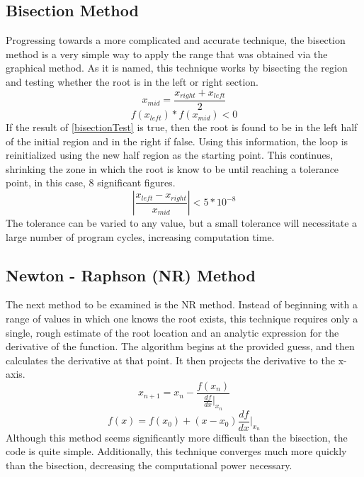 \documentclass[12pt]{article}
\begin{document}
\subsection{Bisection Method}
Progressing towards a more complicated and accurate technique, the bisection method is a very simple way to apply the range that was obtained via the graphical method.  As it is named, this technique works by bisecting the region and testing whether the root is in the left or right section.  
\begin{equation}
\label{midpoint}
x_{mid} = \frac{x_{right}+x_{left}}{2}
\end{equation}
\begin{equation}
\label{bisectionTest}
f(x_{left})*f(x_{mid}) < 0
\end{equation}
If the result of  \eqref{bisectionTest} is true, then the root is found to be in the left half of the initial region and in the right if false.  Using this information, the loop is reinitialized using the new half region as the starting point.  This continues, shrinking the zone in which the root is know to be until reaching a tolerance point, in this case, 8 significant figures.
\begin{equation}
\label{bisectionTol}
|\frac{x_{left}-x_{right}}{x_{mid}}| < 5*10^{-8}
\end{equation}
The tolerance can be varied to any value, but a small tolerance will necessitate a large number of program cycles, increasing computation time.  
\subsection{Newton - Raphson (NR) Method}
The next method to be examined is the NR method.  Instead of beginning with a range of values in which one knows the root exists, this technique requires only a single, rough estimate of the root location and an analytic expression for the derivative of the function.  The algorithm begins at the provided guess, and then calculates the derivative at that point.  It then projects the derivative to the x-axis.  
\begin{equation}
\label{NR1}
x_{n+1} = x_n - \frac{f(x_n)}{\frac{df}{dx}|_{x_n}}
\end{equation}
\begin{equation}
\label{NR2}
f(x) = f(x_0) + (x-x_0)\frac{df}{dx}|_{x_n}
\end{equation}
Although this method seems significantly more difficult than the bisection, the code is quite simple.  Additionally, this technique converges much more quickly than the bisection, decreasing the computational power necessary.
\end{document}
